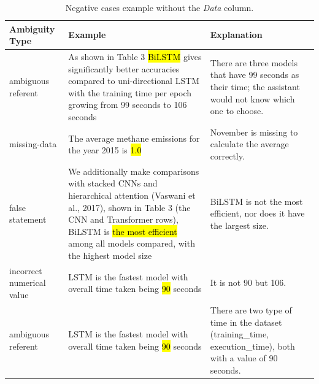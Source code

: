 \begin{table}[t]
    \centering
    \small
    \begin{tabular}{p{3cm} p{6cm} p{4cm}}
        \hline
        \textbf{Ambiguity Type} & \textbf{Example} & \textbf{Explanation} \\
        \hline

        ambiguous referent &
        As shown in Table 3 \hl{BiLSTM} gives significantly better accuracies compared to uni-directional LSTM with the training time per epoch growing from 99 seconds to 106 seconds &
        There are three models that have 99 seconds as their time; the assistant would not know which one to choose. \\

        missing-data &
        The average methane emissions for the year 2015 is \hl{1.0} &
        November is missing to calculate the average correctly. \\

        false statement &
        We additionally make comparisons with stacked CNNs and hierarchical attention (Vaswani et al., 2017), shown in Table 3 (the CNN and Transformer rows), BiLSTM is \hl{the most efficient} among all models compared, with the highest model size &
        BiLSTM is not the most efficient, nor does it have the largest size. \\

        incorrect numerical value &
        LSTM is the fastest model with overall time taken being \hl{90} seconds &
        It is not 90 but 106. \\

        ambiguous referent &
        LSTM is the fastest model with overall time taken being \hl{90} seconds &
        There are two type of time in the dataset (training\_time, execution\_time), both with a value of 90 seconds. \\

        \hline
    \end{tabular}
    \caption{Negative cases example without the \emph{Data} column.}
    \label{tab:ambiguita}
\end{table}





